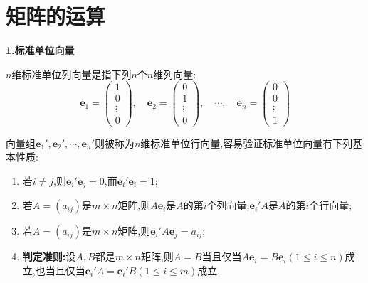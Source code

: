 \documentclass[../../main.tex]{subfiles}
\begin{document}
\section{矩阵的运算}

\begin{proposition}[标准单位向量和基础矩阵]\label{proposition:标准单位向量和基础矩阵}
\large{\textbf{1.标准单位向量}}

\(n\)维标准单位列向量是指下列\(n\)个\(n\)维列向量:
\[
\boldsymbol{e}_{1}=\left(\begin{array}{c}
1 \\
0 \\
\vdots \\
0
\end{array}\right), \quad \boldsymbol{e}_{2}=\left(\begin{array}{c}
0 \\
1 \\
\vdots \\
0
\end{array}\right), \quad \cdots, \quad \boldsymbol{e}_{n}=\left(\begin{array}{c}
0 \\
0 \\
\vdots \\
1
\end{array}\right)
\]

向量组\(\boldsymbol{e}_{1}', \boldsymbol{e}_{2}', \cdots, \boldsymbol{e}_{n}'\)则被称为\(n\)维标准单位行向量,容易验证标准单位向量有下列基本性质:
\begin{enumerate}
\item 若\(i \neq j\),则\(\boldsymbol{e}_{i}' \boldsymbol{e}_{j}=0\),而\(\boldsymbol{e}_{i}' \boldsymbol{e}_{i}=1\);

\item 若\(A=(a_{ij})\)是\(m\times n\)矩阵,则\(A\boldsymbol{e}_{i}\)是\(A\)的第\(i\)个列向量;\(\boldsymbol{e}_{i}'A\)是\(A\)的第\(i\)个行向量;

\item 若\(A=(a_{ij})\)是\(m\times n\)矩阵,则\(\boldsymbol{e}_{i}'A\boldsymbol{e}_{j}=a_{ij}\);

\item \label{矩阵相等的判定准则}\hypertarget{proposition:矩阵相等的判定法则}{\textbf{判定准则:}}设\(A,B\)都是\(m\times n\)矩阵,则\(A = B\)当且仅当\(A\boldsymbol{e}_{i}=B\boldsymbol{e}_{i}(1\leq i\leq n)\)成立,也当且仅当\(\boldsymbol{e}_{i}'A=\boldsymbol{e}_{i}'B(1\leq i\leq m)\)成立.
\end{enumerate}


\end{proposition}
\end{document}
